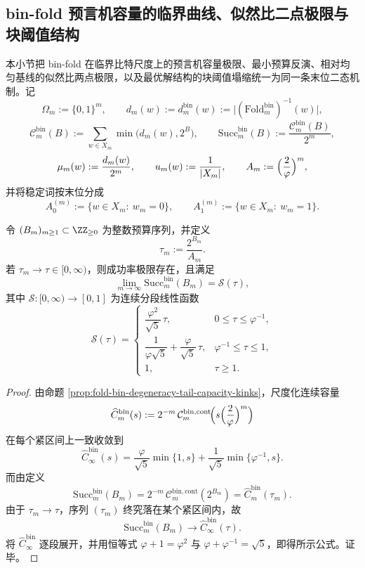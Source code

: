 \subsection{bin-fold 预言机容量的临界曲线、似然比二点极限与块阈值结构}\label{subsec:conclusion-foldbin-critical-capacity-likelihood-neyman-pearson}
本小节把 bin-fold 在临界比特尺度上的预言机容量极限、最小预算反演、相对均匀基线的似然比两点极限，以及最优解结构的块阈值塌缩统一为同一条末位二态机制。记
\[
\Omega_m:=\{0,1\}^m,\qquad
d_m(w):=d_m^{\mathrm{bin}}(w):=\bigl|(\mathrm{Fold}^{\mathrm{bin}}_m)^{-1}(w)\bigr|,
\]
\[
\mathcal C_m^{\mathrm{bin}}(B):=\sum_{w\in X_m}\min\bigl(d_m(w),2^B\bigr),
\qquad
\mathrm{Succ}_m^{\mathrm{bin}}(B):=\frac{\mathcal C_m^{\mathrm{bin}}(B)}{2^m},
\]
\[
\mu_m(w):=\frac{d_m(w)}{2^m},\qquad
u_m(w):=\frac{1}{|X_m|},
\qquad
A_m:=\Bigl(\frac{2}{\varphi}\Bigr)^m,
\]
并将稳定词按末位分成
\[
A_0^{(m)}:=\{w\in X_m:\ w_m=0\},
\qquad
A_1^{(m)}:=\{w\in X_m:\ w_m=1\}.
\]

\begin{theorem}\label{thm:conclusion-foldbin-oracle-critical-profile}
令 \((B_m)_{m\ge 1}\subset\ZZ_{\ge 0}\) 为整数预算序列，并定义
\[
\tau_m:=\frac{2^{B_m}}{A_m}.
\]
若 \(\tau_m\to\tau\in[0,\infty)\)，则成功率极限存在，且满足
\[
\lim_{m\to\infty}\mathrm{Succ}_m^{\mathrm{bin}}(B_m)=\mathscr S(\tau),
\]
其中 \(\mathscr S:[0,\infty)\to[0,1]\) 为连续分段线性函数
\[
\mathscr S(\tau)=
\begin{cases}
\dfrac{\varphi^2}{\sqrt5}\,\tau, & 0\le \tau\le \varphi^{-1},\\[8pt]
\dfrac{1}{\varphi\sqrt5}+\dfrac{\varphi}{\sqrt5}\,\tau, & \varphi^{-1}\le \tau\le 1,\\[10pt]
1, & \tau\ge 1.
\end{cases}
\]
\end{theorem}
\begin{proof}
由命题 \ref{prop:fold-bin-degeneracy-tail-capacity-kinks}，尺度化连续容量
\[
\widehat C_m^{\mathrm{bin}}(s):=
2^{-m}\,\mathcal C_m^{\mathrm{bin,cont}}\!\Bigl(s\Bigl(\frac{2}{\varphi}\Bigr)^m\Bigr)
\]
在每个紧区间上一致收敛到
\[
\widehat C_\infty^{\mathrm{bin}}(s)=\frac{\varphi}{\sqrt5}\min\{1,s\}+\frac{1}{\sqrt5}\min\{\varphi^{-1},s\}.
\]
而由定义
\[
\mathrm{Succ}_m^{\mathrm{bin}}(B_m)
=
2^{-m}\,\mathcal C_m^{\mathrm{bin,cont}}(2^{B_m})
=
\widehat C_m^{\mathrm{bin}}(\tau_m).
\]
由于 \(\tau_m\to\tau\)，序列 \((\tau_m)\) 终究落在某个紧区间内，故
\[
\mathrm{Succ}_m^{\mathrm{bin}}(B_m)\longrightarrow \widehat C_\infty^{\mathrm{bin}}(\tau).
\]
将 \(\widehat C_\infty^{\mathrm{bin}}\) 逐段展开，并用恒等式
\(
\varphi+1=\varphi^2
\)
与
\(
\varphi+\varphi^{-1}=\sqrt5
\)，即得所示公式。证毕。
\end{proof}

